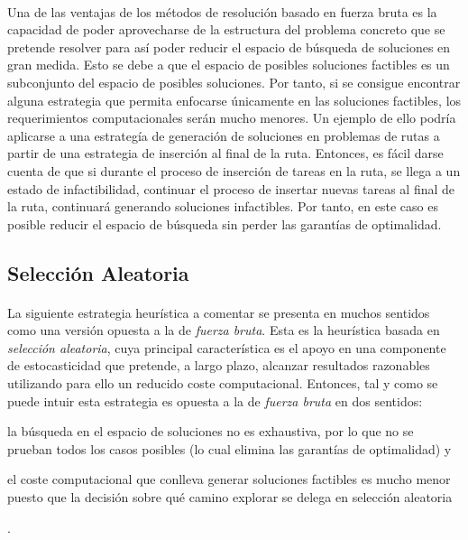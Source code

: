 \documentclass{subfiles}
\begin{document}
        \paragraph{}
        Una de las ventajas de los métodos de resolución basado en fuerza bruta es la capacidad de poder aprovecharse de la estructura del problema concreto que se pretende resolver para así poder reducir el espacio de búsqueda de soluciones en gran medida. Esto se debe a que el espacio de posibles soluciones factibles es un subconjunto del espacio de posibles soluciones. Por tanto, si se consigue encontrar alguna estrategia que permita enfocarse únicamente en las soluciones factibles, los requerimientos computacionales serán mucho menores. Un ejemplo de ello podría aplicarse a una estrategía de generación de soluciones en problemas de rutas a partir de una estrategia de inserción al final de la ruta. Entonces, es fácil darse cuenta de que si durante el proceso de inserción de tareas en la ruta, se llega a un estado de infactibilidad, continuar el proceso de insertar nuevas tareas al final de la ruta, continuará generando soluciones infactibles. Por tanto, en este caso es posible reducir el espacio de búsqueda sin perder las garantías de optimalidad. 

      \subsection{Selección Aleatoria}
      \label{sec:solving_random}

        \paragraph{}
        La siguiente estrategia heurística a comentar se presenta en muchos sentidos como una versión opuesta a la de \emph{fuerza bruta}. Esta es la heurística basada en \emph{selección aleatoria}, cuya principal característica es el apoyo en una componente de estocasticidad que pretende, a largo plazo, alcanzar resultados razonables utilizando para ello un reducido coste computacional. Entonces, tal y como se puede intuir esta estrategia es opuesta a la de \emph{fuerza bruta} en dos sentidos: \begin{enumerate*}[label=(\arabic*)] \item la búsqueda en el espacio de soluciones no es exhaustiva, por lo que no se prueban todos los casos posibles (lo cual elimina las garantías de optimalidad) y \item el coste computacional que conlleva generar soluciones factibles es mucho menor puesto que la decisión sobre qué camino explorar se delega en selección aleatoria \end{enumerate*}.
\end{document}
